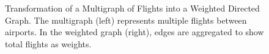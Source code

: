 \begin{figure}[h]
    \caption{Transformation of a Multigraph of Flights into a Weighted Directed Graph. The multigraph (left) represents multiple flights between airports. In the weighted graph (right), edges are aggregated to show total flights as weights.}
    \label{fig:multigraph_to_weighted_graph}
\end{figure}
